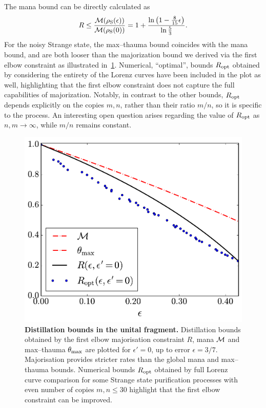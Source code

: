 \documentclass[pra,
aps,
twocolumn,
superscriptaddress,
groupedaddress,
nofootinbib,
reprint
]{revtex4-1}
\begin{document}
The mana bound can be directly calculated as
\begin{equation}
	R \leq \frac{{{\mathcal M}(\rho_{\rm{S}}(\epsilon))}}{{{\mathcal M}(\rho_{\rm{S}}(0))}} = 1 + \frac{\ln \left(1 - \frac{8}{15}\epsilon \right)}{\ln \frac{5}{3}}.
\end{equation}
For the noisy Strange state, the max--thauma bound coincides with the mana bound, and are both looser than the majorization bound we derived via the first elbow constraint as illustrated in~\cref{fig:distill_bounds}. 
Numerical, ``optimal'', bounds $R_{\rm{opt}}$ obtained by considering the entirety of the Lorenz curves have been included in the plot as well, highlighting that the first elbow constraint does not capture the full capabilities of majorization.
Notably, in contrast to the other bounds, $R_{\rm{opt}}$ depends explicitly on the copies $m,n$, rather than their ratio $m/n$, so it is specific to the process.
An interesting open question arises regarding the value of $R_{\rm{opt}}$ as $n,m \rightarrow \infty$, while $m/n$ remains constant.
\begin{figure}[t]
    \centering
    \includegraphics[scale=0.45]{figs/distill_bounds.pdf}
    \caption{\textbf{Distillation bounds in the unital fragment.} Distillation bounds obtained by the first elbow majorisation constraint $R$, mana ${\mathcal M}$ and max--thauma $\theta_{\rm{max}}$ are plotted for $\epsilon' = 0$, up to error $\epsilon = 3/7$.
    Majorisation provides stricter rates than the global mana and max--thauma bounds.
    Numerical bounds $R_{\rm{opt}}$ obtained by full Lorenz curve comparison for some Strange state purification processes with even number of copies $m,n \leq 30$ highlight that the first elbow constraint can be improved.
    }
    \label{fig:distill_bounds}
\end{figure}
\end{document}
